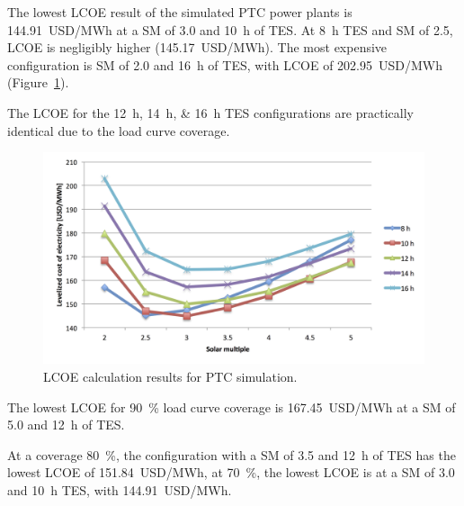 
The lowest LCOE result of the simulated PTC power plants is \SI{144.91}{USD/MWh} at a SM of \num{3.0} and \SI{10}{h} of TES. At \SI{8}{h} TES and SM of \num{2.5}, LCOE is negligibly higher (\SI{145.17}{USD/MWh}). The most expensive configuration is SM of 2.0 and \SI{16}{h} of TES, with LCOE of \SI{202.95}{USD/MWh} (Figure~\ref{PTC_LCOE}). 

The LCOE for the \SIlist{12;14;16}{h} TES configurations are practically identical due to the load curve coverage.

\begin{figure}[htbp]
\centering
\includegraphics[width=1\linewidth]{FIG/PTC_LCOE}
\caption[LCOE calculation results for PTC simulation.]{LCOE calculation results for PTC simulation.}\label{PTC_LCOE}
\end{figure}


The lowest LCOE for \SI{90}{\percent} load curve coverage is \SI{167.45}{USD/MWh} at a SM of \num{5.0} and \SI{12}{h} of TES.


At a coverage \SI{80}{\percent}, the configuration with a SM of \num{3.5} and \SI{12}{h} of TES has the lowest LCOE of \SI{151.84}{USD/MWh}, at \SI{70}{\percent}, the lowest LCOE is at a SM of \num{3.0} and \SI{10}{h} TES, with \SI{144.91}{USD/MWh}.
